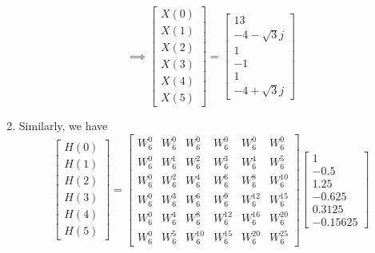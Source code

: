 \documentclass[journal,12pt,twocolumn]{IEEEtran}
\renewcommand\thesection{\arabic{section}}
\begin{document}
\begin{enumerate}[label=\thesection.\arabic*.,ref=\thesection.\theenumi]
\begin{equation}
\implies
\begin{bmatrix} 
X(0) \\ 
X(1) \\ 
X(2) \\ 
X(3) \\ 
X(4) \\ 
X(5) 
\end{bmatrix}
=
\begin{bmatrix}
13 \\ 
-4-\sqrt{3}j\\ 
1  \\ 
-1 \\ 
1 \\ 
-4+\sqrt{3}j
\end{bmatrix}
\end{equation}

\item
Similarly, we have
\begin{equation}
\begin{bmatrix} 
H(0) \\ 
H(1) \\ 
H(2) \\ 
H(3) \\ 
H(4) \\ 
H(5) 
\end{bmatrix}
=
\begin{bmatrix}
W^{0}_{6} & W^{0}_{6} & W^{0}_{6} & W^{0}_{6} & W^{0}_{6} & W^{0}_{6}\\
W^{0}_{6} & W^{1}_{6} & W^{2}_{6} & W^{3}_{6} & W^{4}_{6} & W^{5}_{6}\\
W^{0}_{6} & W^{2}_{6} & W^{4}_{6} & W^{6}_{6} & W^{8}_{6} & W^{10}_{6}\\
W^{0}_{6} & W^{3}_{6} & W^{6}_{6} & W^{9}_{6} & W^{12}_{6} & W^{15}_{6}\\
W^{0}_{6} & W^{4}_{6} & W^{8}_{6} & W^{12}_{6} & W^{16}_{6} & W^{20}_{6}\\
W^{0}_{6} & W^{5}_{6} & W^{10}_{6} & W^{15}_{6} & W^{20}_{6} & W^{25}_{6} 
\end{bmatrix}
\begin{bmatrix}
1 \\ 
-0.5 \\ 
1.25 \\ 
-0.625 \\ 
0.3125 \\ 
-0.15625
\end{bmatrix}
\end{equation}



\end{enumerate}
\end{document}
